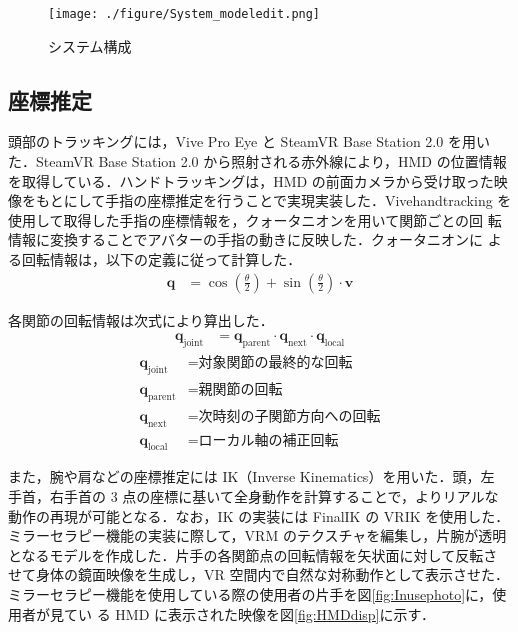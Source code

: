 \begin{figure}[htb]
    \centering
    \texttt{[image: ./figure/System\_modeledit.png]}
    \caption{システム構成}
    \label{fig:system}
\end{figure}

\subsection{座標推定}
頭部のトラッキングには，Vive Pro Eye と SteamVR Base Station 2.0 を用い
た．SteamVR Base Station 2.0 から照射される赤外線により，HMD の位置情報
を取得している．ハンドトラッキングは，HMD の前面カメラから受け取った映
像をもとにして手指の座標推定を行うことで実現実装した．Vivehandtracking
を使用して取得した手指の座標情報を，クォータニオンを用いて関節ごとの回
転情報に変換することでアバターの手指の動きに反映した．クォータニオンに
よる回転情報は，以下の定義に従って計算した．
\begin{align}
    \mathbf{q} &= \cos\left(\frac{\theta}{2}\right) 
                 + \sin\left(\frac{\theta}{2}\right) \cdot \mathbf{v}
\end{align}

各関節の回転情報は次式により算出した．
\begin{align}
    \mathbf{q}_{\text{joint}} &= 
    \mathbf{q}_{\text{parent}} \cdot 
    \mathbf{q}_{\text{next}} \cdot 
    \mathbf{q}_{\text{local}}
\end{align}
\begin{equation*}
\begin{aligned}
    \mathbf{q}_{\text{joint}}  &= \text{対象関節の最終的な回転} \\
    \mathbf{q}_{\text{parent}} &= \text{親関節の回転} \\
    \mathbf{q}_{\text{next}}   &= \text{次時刻の子関節方向への回転} \\
    \mathbf{q}_{\text{local}}  &= \text{ローカル軸の補正回転}
\end{aligned}
\end{equation*}

また，腕や肩などの座標推定には IK（Inverse Kinematics）を用いた．頭，左
手首，右手首の 3 点の座標に基いて全身動作を計算することで，よりリアルな
動作の再現が可能となる．なお，IK の実装には FinalIK の VRIK を使用した．
ミラーセラピー機能の実装に際して，VRM のテクスチャを編集し，片腕が透明
となるモデルを作成した．片手の各関節点の回転情報を矢状面に対して反転さ
せて身体の鏡面映像を生成し，VR 空間内で自然な対称動作として表示させた．
ミラーセラピー機能を使用している際の使用者の片手を図\ref{fig:Inusephoto}に，使用者が見てい
る HMD に表示された映像を図\ref{fig:HMDdisp}に示す．

